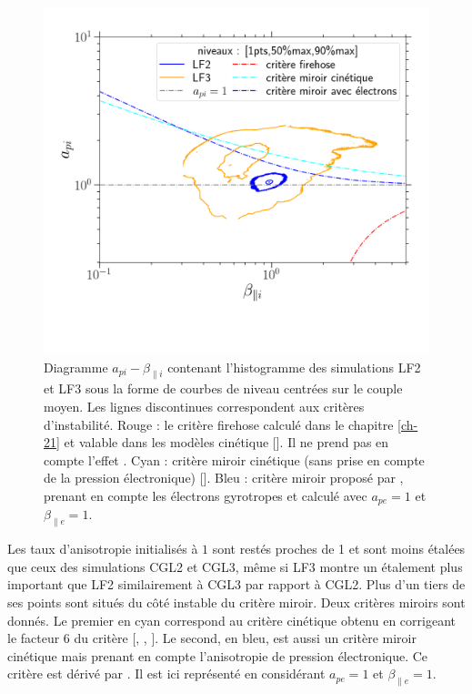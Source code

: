 \begin{figure}[!ht]
 \centering
\includegraphics[width=0.9\linewidth,trim=0cm 3cm 1cm 1cm, clip=true]{./Mainmatter/Part_3/images_ch4/diag_simu_LF}
\cprotect\caption{Diagramme \ensuremath{a_{pi}-\beta_{\parallel i}} contenant l'histogramme  des simulations LF2 et LF3 sous la forme de courbes de niveau centrées sur le couple moyen. Les lignes discontinues correspondent aux critères d'instabilité. Rouge : le critère firehose  calculé dans le chapitre \ref{ch-21} et valable dans les modèles cinétique [\cite{hunana_introductory_2019}]. Il ne prend pas en compte l'effet . Cyan : critère miroir cinétique (sans prise en compte de la pression électronique) [\cite{hunana_introductory_2019}]. Bleu : critère miroir proposé par \cite{kuznetsov_mirror_2012}, prenant en compte les électrons gyrotropes et calculé avec $a_{pe} = 1$ et $\beta_{\parallel e } = 1$.}
\label{fig:diag_simu_LF}
\end{figure} 

Les taux d'anisotropie initialisés à $\num{1}$ sont restés proches de 1 et sont moins étalées que ceux des simulations CGL2 et CGL3, même si LF3 montre un étalement plus important que LF2 similairement à CGL3 par rapport à CGL2. Plus d'un tiers de ses points sont situés du côté instable du critère miroir. Deux critères miroirs sont donnés. Le premier en cyan correspond au critère cinétique obtenu en corrigeant le facteur 6 du critère  [\cite{galeev_mhd_1983}, \cite{ferriere_mixed_2002}, \cite{hunana_introductory_2019}]. Le second, en bleu, est aussi un critère miroir cinétique mais prenant en compte l'anisotropie de pression électronique. Ce critère est dérivé par \cite{kuznetsov_mirror_2012}. Il est ici représenté en considérant $a_{pe} = 1$ et $\beta_{\parallel e } = 1$. 

